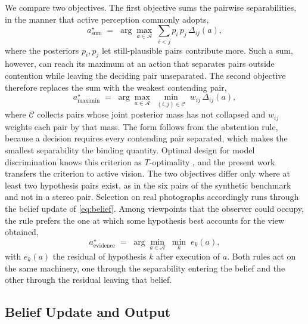 \documentclass{article} %
\theoremstyle{defstyle}
\theoremstyle{plain}
\begin{document}
We compare two objectives. The first objective sums the pairwise separabilities, in the manner
that active perception commonly adopts,
\begin{equation}
\label{eq:sum}
a^{\star}_{\text{sum}} \;=\; \arg\max_{a \in \mathcal{A}} \;\sum_{i<j} p_i\, p_j\,
\Delta_{ij}(a),
\end{equation}
where the posteriors $p_i, p_j$ let still-plausible pairs contribute more. Such a sum, however,
can reach its maximum at an action that separates pairs outside contention while leaving the
deciding pair unseparated. The second objective therefore replaces the sum with the weakest
contending pair,
\begin{equation}
\label{eq:maximin}
a^{\star}_{\text{maximin}} \;=\; \arg\max_{a \in \mathcal{A}} \;\min_{(i,j) \in \mathcal{C}} \;
w_{ij}\, \Delta_{ij}(a),
\end{equation}
where $\mathcal{C}$ collects pairs whose joint posterior mass has not collapsed and $w_{ij}$
weights each pair by that mass. The form follows from the abstention rule, because a decision
requires every contending pair separated, which makes the smallest separability the binding
quantity. Optimal design for model discrimination knows this criterion as $T$-optimality
\citep{atkinson1975design,hunter1965experimental}, and the present work transfers the criterion
to active vision. The two objectives differ only where at least two hypothesis pairs exist, as
in the six pairs of the synthetic benchmark and not in a stereo pair. Selection on real
photographs accordingly runs through the belief update of \eqref{eq:belief}. Among viewpoints
that the observer could occupy, the rule prefers the one at which some hypothesis best accounts
for the view obtained,
\begin{equation}
\label{eq:evidence-selection}
a^{\star}_{\text{evidence}} \;=\; \arg\min_{a \in \mathcal{A}} \; \min_{k} \; e_k(a),
\end{equation}
with $e_k(a)$ the residual of hypothesis $k$ after execution of $a$. Both rules act on the same
machinery, one through the separability entering the belief and the other through the residual
leaving that belief.

\subsection{Belief Update and Output}
\label{sec:belief}
\end{document}
